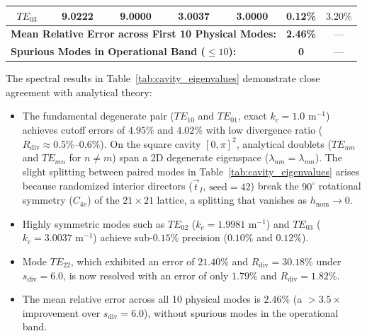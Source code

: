 \documentclass[VANCOUVER,Times1COL]{WileyNJD-v5}
\begin{document}
\begin{table}[!t]
{\begin{tabular}{ccccccc}
            $TE_{03}$                                                                        & 9.0222                                                    & 9.0000                                                    & 3.0037                                                 & 3.0000                                                 & \textbf{0.12\%}                                 & $3.20\%$                                      \\
            \midrule
            \multicolumn{5}{l}{\textbf{Mean Relative Error across First 10 Physical Modes:}} & \textbf{2.46\%}                                           & ---                                                                                                                                                                                                                                                                           \\
            \multicolumn{5}{l}{\textbf{Spurious Modes in Operational Band ($\le 10$):}}      & \textbf{0}                                                & ---                                                                                                                                                                                                                                                                           \\
            \bottomrule
        \end{tabular}
    }
\end{table}

The spectral results in Table~\ref{tab:cavity_eigenvalues} demonstrate close agreement with analytical theory:
\begin{itemize}
    \item The fundamental degenerate pair ($TE_{10}$ and $TE_{01}$, exact $k_c = 1.0\text{ m}^{-1}$) achieves cutoff errors of $4.95\%$ and $4.02\%$ with low divergence ratio ($R_{\mathrm{div}} \approx 0.5\%\text{--}0.6\%$). On the square cavity $[0, \pi]^2$, analytical doublets ($TE_{nm}$ and $TE_{mn}$ for $n \ne m$) span a 2D degenerate eigenspace ($\lambda_{nm} = \lambda_{mn}$). The slight splitting between paired modes in Table~\ref{tab:cavity_eigenvalues} arises because randomized interior directors ($\vec{t}_I$, $\text{seed}=42$) break the $90^\circ$ rotational symmetry ($C_{4v}$) of the $21\times 21$ lattice, a splitting that vanishes as $h_{\mathrm{nom}} \to 0$.
    \item Highly symmetric modes such as $TE_{02}$ ($k_c = 1.9981\text{ m}^{-1}$) and $TE_{03}$ ($k_c = 3.0037\text{ m}^{-1}$) achieve sub-$0.15\%$ precision ($0.10\%$ and $0.12\%$).
    \item Mode $TE_{22}$, which exhibited an error of $21.40\%$ and $R_{\mathrm{div}} = 30.18\%$ under $s_{\mathrm{div}} = 6.0$, is now resolved with an error of only $\mathbf{1.79\%}$ and $R_{\mathrm{div}} = 1.82\%$.
    \item The mean relative error across all 10 physical modes is $\mathbf{2.46\%}$ (a $>3.5\times$ improvement over $s_{\mathrm{div}} = 6.0$), without spurious modes in the operational band.
\end{itemize}
\end{document}
